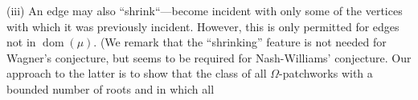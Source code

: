 \hspace*{12pt}(iii) An edge may also ``shrink``---become incident with only some of the vertices with which it was previously incident. However, this is only permitted for edges not in $\operatorname{dom}(\mu)$. (We remark that the ``shrinking'' feature is not needed for Wagner's conjecture, but seems to be required for Nash-Williams' conjecture. Our approach to the latter is to show that the class of all $\Omega$-patchworks with a bounded number of roots and in which all
